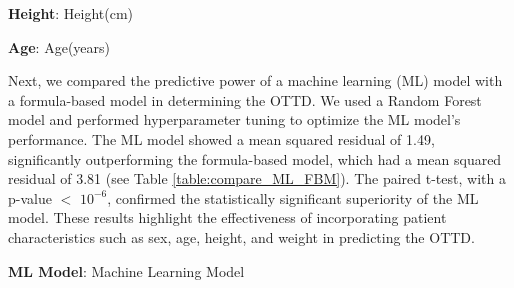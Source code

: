 \documentclass[11pt]{article}
\begin{document}
\begin{table}[h]
\caption{Descriptive statistics of Height and Age stratified by Sex}
\label{table:descr_stats_height_age}
\begin{threeparttable}
\renewcommand{\TPTminimum}{\linewidth}
\begin{tablenotes}
\footnotesize
\item \textbf{Height}: Height(cm)
\item \textbf{Age}: Age(years)
\end{tablenotes}
\end{threeparttable}
\end{table}


Next, we compared the predictive power of a machine learning (ML) model with a formula-based model in determining the OTTD. We used a Random Forest model and performed hyperparameter tuning to optimize the ML model's performance. The ML model showed a mean squared residual of 1.49, significantly outperforming the formula-based model, which had a mean squared residual of 3.81 (see Table {}\ref{table:compare_ML_FBM}). The paired t-test, with a p-value $<$ $10^{-6}$, confirmed the statistically significant superiority of the ML model. These results highlight the effectiveness of incorporating patient characteristics such as sex, age, height, and weight in predicting the OTTD.

\begin{table}[h]
\caption{Comparison of predictive power: ML Model vs. Formula-based Model}
\label{table:compare_ML_FBM}
\begin{threeparttable}
\renewcommand{\TPTminimum}{\linewidth}
\begin{tablenotes}
\footnotesize
\item \textbf{ML Model}: Machine Learning Model
\end{tablenotes}
\end{threeparttable}
\end{table}
\end{document}
